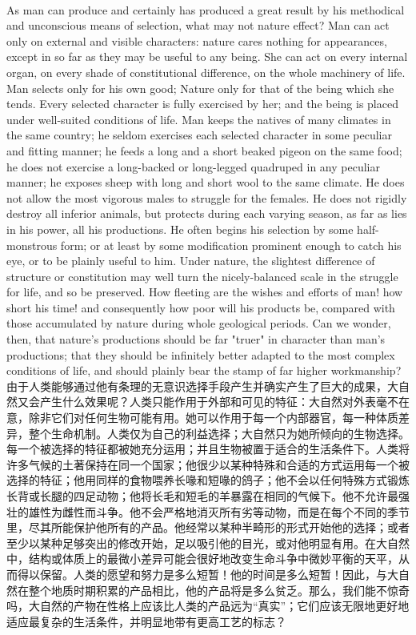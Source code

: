 \documentclass{article}
\begin{document}
\\
As man can produce and certainly has produced a great result by his methodical and unconscious means of selection, what may not nature effect? Man can act only on external and visible characters: nature cares nothing for appearances, except in so far as they may be useful to any being. She can act on every internal organ, on every shade of constitutional difference, on the whole machinery of life. Man selects only for his own good; Nature only for that of the being which she tends. Every selected character is fully exercised by her; and the being is placed under well-suited conditions of life. Man keeps the natives of many climates in the same country; he seldom exercises each selected character in some peculiar and fitting manner; he feeds a long and a short beaked pigeon on the same food; he does not exercise a long-backed or long-legged quadruped in any peculiar manner; he exposes sheep with long and short wool to the same climate. He does not allow the most vigorous males to struggle for the females. He does not rigidly destroy all inferior animals, but protects during each varying season, as far as lies in his power, all his productions. He often begins his selection by some half-monstrous form; or at least by some modification prominent enough to catch his eye, or to be plainly useful to him. Under nature, the slightest difference of structure or constitution may well turn the nicely-balanced scale in the struggle for life, and so be preserved. How fleeting are the wishes and efforts of man! how short his time! and consequently how poor will his products be, compared with those accumulated by nature during whole geological periods. Can we wonder, then, that nature's productions should be far "truer" in character than man's productions; that they should be infinitely better adapted to the most complex conditions of life, and should plainly bear the stamp of far higher workmanship?\\
由于人类能够通过他有条理的无意识选择手段产生并确实产生了巨大的成果，大自然又会产生什么效果呢？人类只能作用于外部和可见的特征：大自然对外表毫不在意，除非它们对任何生物可能有用。她可以作用于每一个内部器官，每一种体质差异，整个生命机制。人类仅为自己的利益选择；大自然只为她所倾向的生物选择。每一个被选择的特征都被她充分运用；并且生物被置于适合的生活条件下。人类将许多气候的土著保持在同一个国家；他很少以某种特殊和合适的方式运用每一个被选择的特征；他用同样的食物喂养长喙和短喙的鸽子；他不会以任何特殊方式锻炼长背或长腿的四足动物；他将长毛和短毛的羊暴露在相同的气候下。他不允许最强壮的雄性为雌性而斗争。他不会严格地消灭所有劣等动物，而是在每个不同的季节里，尽其所能保护他所有的产品。他经常以某种半畸形的形式开始他的选择；或者至少以某种足够突出的修改开始，足以吸引他的目光，或对他明显有用。在大自然中，结构或体质上的最微小差异可能会很好地改变生命斗争中微妙平衡的天平，从而得以保留。人类的愿望和努力是多么短暂！他的时间是多么短暂！因此，与大自然在整个地质时期积累的产品相比，他的产品将是多么贫乏。那么，我们能不惊奇吗，大自然的产物在性格上应该比人类的产品远为“真实”；它们应该无限地更好地适应最复杂的生活条件，并明显地带有更高工艺的标志？\\
\end{document}
